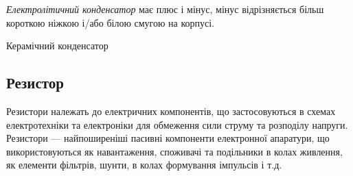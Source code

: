 \documentclass[12pt,a4paper]{report}  %
\begin{document}
\textit{Електролітичний конденсатор} має плюс і мінус, мінус відрізняється більш короткою ніжкою і/або білою смугою на корпусі.

\begin{figure}[h!]
\label{ris:image}
\end{figure}

\begin{figure}[h!]
\end{figure}




Керамічний конденсатор

\begin{figure}[h!]
\label{ris:image}
\end{figure}


\begin{center}
\end{center}

\subsection{Резистор}

Резистори належать до електричних компонентів, що застосовуються в схемах електротехніки та електроніки для обмеження сили струму та розподілу напруги. Резистори — найпоширеніші пасивні компоненти електронної апаратури, що використовуються як навантаження, споживачі та подільники в колах живлення, як елементи фільтрів, шунти, в колах формування імпульсів і т.д. 
\end{document}
